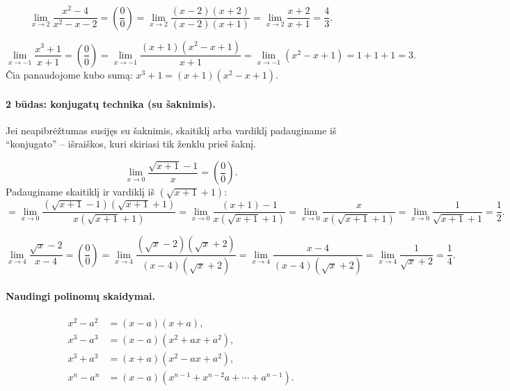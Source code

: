 \begin{example}
\[
  \lim_{x \to 2} \frac{x^2 - 4}{x^2 - x - 2}
  = \left(\frac{0}{0}\right)
  = \lim_{x \to 2} \frac{(x-2)(x+2)}{(x-2)(x+1)}
  = \lim_{x \to 2} \frac{x+2}{x+1}
  = \frac{4}{3}.
\]
\end{example}

\begin{example}
\[
  \lim_{x \to -1} \frac{x^3 + 1}{x + 1}
  = \left(\frac{0}{0}\right)
  = \lim_{x \to -1} \frac{(x+1)(x^2 - x + 1)}{x+1}
  = \lim_{x \to -1}(x^2 - x + 1)
  = 1 + 1 + 1 = 3.
\]
Čia panaudojome kubo sumą: $x^3 + 1 = (x+1)(x^2 - x + 1)$.
\end{example}

\paragraph{2 būdas: konjugatų technika (su šaknimis).}
Jei neapibrėžtumas susijęs su šaknimis, skaitiklį arba vardiklį padauginame iš
``konjugato'' -- išraiškos, kuri skiriasi tik ženklu prieš šaknį.

\begin{example}
\[
  \lim_{x \to 0} \frac{\sqrt{x+1} - 1}{x}
  = \left(\frac{0}{0}\right).
\]
Padauginame skaitiklį ir vardiklį iš $(\sqrt{x+1} + 1)$:
\[
  = \lim_{x \to 0} \frac{(\sqrt{x+1} - 1)(\sqrt{x+1} + 1)}{x(\sqrt{x+1} + 1)}
  = \lim_{x \to 0} \frac{(x+1) - 1}{x(\sqrt{x+1} + 1)}
  = \lim_{x \to 0} \frac{x}{x(\sqrt{x+1} + 1)}
  = \lim_{x \to 0} \frac{1}{\sqrt{x+1} + 1}
  = \frac{1}{2}.
\]
\end{example}

\begin{example}
\[
  \lim_{x \to 4} \frac{\sqrt{x} - 2}{x - 4}
  = \left(\frac{0}{0}\right)
  = \lim_{x \to 4} \frac{(\sqrt{x} - 2)(\sqrt{x} + 2)}{(x-4)(\sqrt{x}+2)}
  = \lim_{x \to 4} \frac{x - 4}{(x-4)(\sqrt{x}+2)}
  = \lim_{x \to 4} \frac{1}{\sqrt{x}+2}
  = \frac{1}{4}.
\]
\end{example}

\paragraph{Naudingi polinomų skaidymai.}
\begin{align*}
  x^2 - a^2 &= (x-a)(x+a), \\
  x^3 - a^3 &= (x-a)(x^2+ax+a^2), \\
  x^3 + a^3 &= (x+a)(x^2-ax+a^2), \\
  x^n - a^n &= (x-a)(x^{n-1} + x^{n-2}a + \cdots + a^{n-1}).
\end{align*}

